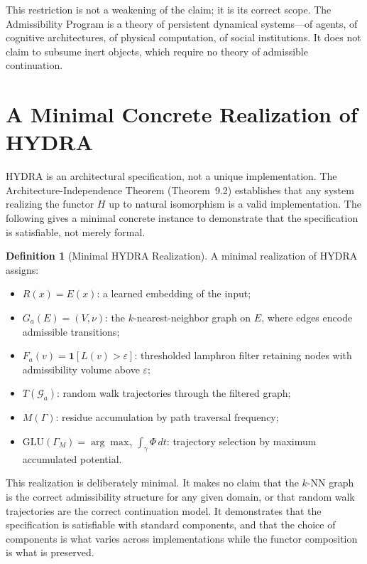 \documentclass[12pt, oneside]{book}
\theoremstyle{flyxion}
\theoremstyle{definition}
\newtheorem{definition}[theorem]{Definition}
\begin{document}
This restriction is not a weakening of the claim; it is its correct
scope. The Admissibility Program is a theory of persistent dynamical
systems---of agents, of cognitive architectures, of physical
computation, of social institutions. It does not claim to subsume
inert objects, which require no theory of admissible continuation.

\section{A Minimal Concrete Realization of HYDRA}

HYDRA is an architectural specification, not a unique implementation.
The Architecture-Independence Theorem (Theorem~9.2) establishes that
any system realizing the functor $H$ up to natural isomorphism is a
valid implementation. The following gives a minimal concrete instance
to demonstrate that the specification is satisfiable, not merely
formal.

\begin{definition}[Minimal HYDRA Realization]
A minimal realization of HYDRA assigns:
\begin{itemize}
\item $R(x) = E(x)$: a learned embedding of the input;
\item $G_a(E) = (V, \nu)$: the $k$-nearest-neighbor graph on $E$,
  where edges encode admissible transitions;
\item $F_a(v) = \mathbf{1}[L(v) > \varepsilon]$: thresholded
  lamphron filter retaining nodes with admissibility volume above
  $\varepsilon$;
\item $T(\mathcal{G}_a)$: random walk trajectories through the
  filtered graph;
\item $M(\Gamma)$: residue accumulation by path traversal frequency;
\item $\mathrm{GLU}(\Gamma_M) = \arg\max_{\gamma} \int_\gamma
  \Phi\,dt$: trajectory selection by maximum accumulated potential.
\end{itemize}
\end{definition}

This realization is deliberately minimal. It makes no claim that the
$k$-NN graph is the correct admissibility structure for any given
domain, or that random walk trajectories are the correct continuation
model. It demonstrates that the specification is satisfiable with
standard components, and that the choice of components is what
varies across implementations while the functor composition is what
is preserved.
\end{document}
